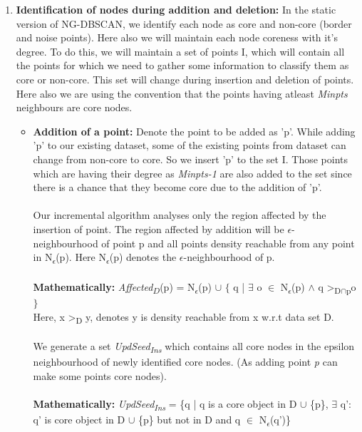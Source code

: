 \documentclass[acmsmall]{acmart}
\begin{document}
\begin{enumerate}
    \item \textbf{Identification of nodes during addition and deletion:} In the static version of NG-DBSCAN, we identify each node as core and non-core (border and noise points). Here also we will maintain each node coreness with it's degree. To do this, we will maintain a set of points I, which will contain all the points for which we need to gather some information to classify them as core or non-core. This set will change during insertion and deletion of points. Here also we are using the convention that the points having atleast \textit{Minpts} neighbours are core nodes. \newline 
    \begin{itemize}
        \item \textbf{Addition of a point:} Denote the point to be added as 'p'. While adding 'p' to our existing dataset, some of the existing points from dataset can change from non-core to core. So we insert 'p' to the set I. Those points which are having their degree as \textit{Minpts-1} are also added to the set since there is a chance that they become core due to the addition of 'p'. \\ \\
        Our incremental algorithm analyses only the region affected by the insertion of point. The region affected by addition will be $\epsilon$-neighbourhood of point p and all points density reachable from any point in N\textsubscript{$\epsilon$}(p). Here N\textsubscript{$\epsilon$}(p) denotes the $\epsilon$-neighbourhood of p. \\ \\ \textbf{Mathematically:} \textit{Affected}\textsubscript{$D$}(p) = N\textsubscript{$\epsilon$}(p) $\cup$ $\{$ q | $\exists$ o $\in$ N\textsubscript{$\epsilon$}(p) $\land$ q >\textsubscript{D$\cap$p}o $\}$ \\ Here, x >\textsubscript{D} y, denotes y is density reachable from x w.r.t data set D. \\ \\  
        We generate a set \textit{UpdSeed\textsubscript{Ins}} which contains all core nodes in the epsilon neighbourhood of newly identified core nodes. (As adding point \textit{p} can make some points core nodes).\\ \\ \textbf{Mathematically:} \textit{UpdSeed\textsubscript{Ins}} = \{q | q is a core object in D $\cup$ \{p\}, $\exists$ q’: q’ is core object in D $\cup$ \{p\} but not in D and q $\in$ N\textsubscript{$\epsilon$}(q')\} \\ \\

\end{itemize}
\end{enumerate}
\end{document}
